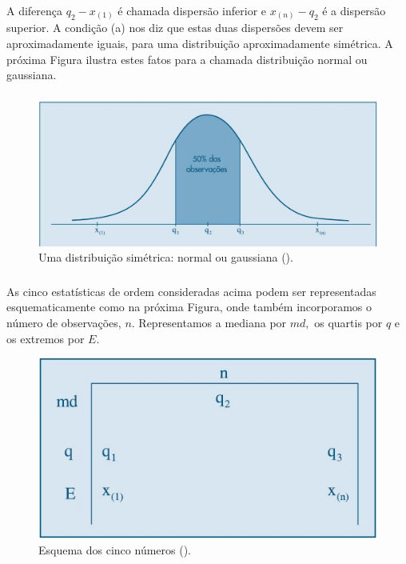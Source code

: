 \documentclass[14pt,aspectratio=1610]{beamer}
\begin{document}
\begin{frame}{}
\frametitle{}
\begin{block}{}
\justifying
A diferença $q_{2}- x_{(1)}$ é chamada dispersão inferior e $x_{(n)}-q_{2}$ é a dispersão superior.
A condição (a) nos diz que estas duas dispersões devem ser aproximadamente iguais, para uma distribuição 
aproximadamente simétrica. A próxima Figura ilustra estes fatos para a chamada distribuição normal ou gaussiana.
\end{block}
\end{frame}

\begin{frame}{}
\frametitle{}
\begin{block}{}
\justifying
\begin{figure}[H]
    \centering
    \includegraphics[scale=0.5]{Fig7}
    \caption{Uma distribuição simétrica: normal ou gaussiana (\cite{Morettin09}).}
    \label{Fig7_ex}
  \end{figure}
\end{block}
\end{frame}

\begin{frame}{}
\frametitle{}
\begin{block}{}
\justifying
As cinco estatísticas de ordem consideradas acima podem ser representadas esquematicamente como na próxima Figura, onde também incorporamos o número de 
observações, $n.$ Representamos a mediana por $md,$ os quartis por $q$ e os extremos por $E.$
\begin{figure}[H]
    \centering
    \includegraphics[scale=0.5]{Fig8}
    \caption{Esquema dos cinco números (\cite{Morettin09}).}
    \label{Fig8_ex}
  \end{figure}
\end{block}
\end{frame}
\end{document}
